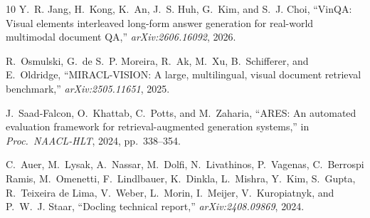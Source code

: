 \documentclass[journal]{IEEEtran}
\begin{document}
\begin{thebibliography}{10}
Y.~R. Jang, H.~Kong, K.~An, J.~S. Huh, G.~Kim, and S.~J. Choi, ``VinQA: Visual
elements interleaved long-form answer generation for real-world multimodal
document QA,'' \emph{arXiv:2606.16092}, 2026.

R.~Osmulski, G.~de S.~P. Moreira, R.~Ak, M.~Xu, B.~Schifferer, and E.~Oldridge,
``MIRACL-VISION: A large, multilingual, visual document retrieval benchmark,''
\emph{arXiv:2505.11651}, 2025.

J.~Saad-Falcon, O.~Khattab, C.~Potts, and M.~Zaharia, ``ARES: An automated
evaluation framework for retrieval-augmented generation systems,'' in
\emph{Proc.\ NAACL-HLT}, 2024, pp.~338--354.

C.~Auer, M.~Lysak, A.~Nassar, M.~Dolfi, N.~Livathinos, P.~Vagenas, C.~Berrospi
Ramis, M.~Omenetti, F.~Lindlbauer, K.~Dinkla, L.~Mishra, Y.~Kim, S.~Gupta,
R.~Teixeira de Lima, V.~Weber, L.~Morin, I.~Meijer, V.~Kuropiatnyk, and
P.~W.~J. Staar, ``Docling technical report,'' \emph{arXiv:2408.09869}, 2024.

\end{thebibliography}
\end{document}

